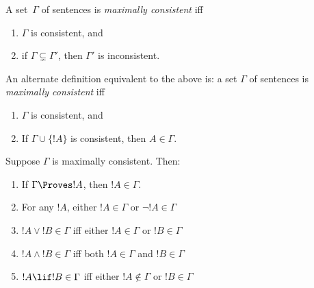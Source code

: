 \documentclass[../../include/open-logic-section]{subfiles}
\begin{document}

\begin{defn}
A set~$\Gamma$ of sentences is \emph{maximally consistent} iff
\begin{enumerate}
\item $\Gamma$ is consistent, and
\item if $\Gamma \subsetneq \Gamma'$, then $\Gamma'$ is inconsistent.
\end{enumerate}
\end{defn}

\begin{wordy} %
An alternate definition equivalent to the above is: a set $\Gamma$ of sentences is 
\emph{maximally consistent} iff
\begin{enumerate}
\item $\Gamma$ is consistent, and
\item If $\Gamma \cup \{ !A \}$ is consistent, then $A \in \Gamma$.
\end{enumerate}
\end{wordy}

\begin{prop}
Suppose $\Gamma$ is maximally consistent. Then:
\begin{enumerate}
\item If $\Gamma \Proves !A$, then $!A \in \Gamma$.
\item For any $!A$, either $!A \in \Gamma$ or $\lnot !A \in \Gamma$
\item $!A \lor !B \in \Gamma$ iff either $!A \in \Gamma$ or $!B \in \Gamma$
\item $!A \land !B \in \Gamma$ iff both $!A \in \Gamma$ and $!B \in \Gamma$
\item $!A \lif !B \in \Gamma$ iff either $!A \notin \Gamma$ or $!B \in \Gamma$
\end{enumerate}
\end{prop}
\end{document}
